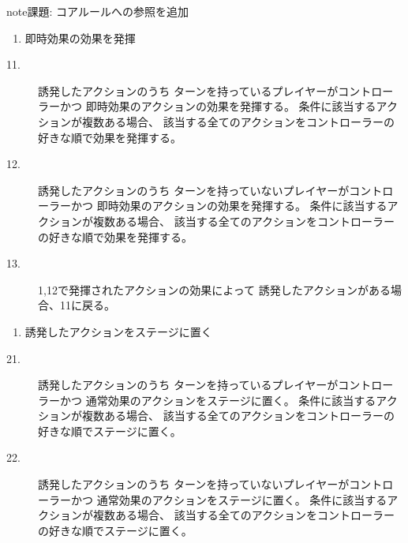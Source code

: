 \documentclass[letterpaper,10pt,dvipdfmx]{sphinxmanual}
\begin{document}
\begin{sphinxadmonition}{note}{\label{\detokenize{common/05-action_detail:id11}}課題:}
コアルールへの参照を追加
\end{sphinxadmonition}
\begin{enumerate}
%
\item {} 
即時効果の効果を発揮

\end{enumerate}
\begin{description}
\item[{1\sphinxhyphen{}1.}] \leavevmode
誘発したアクションのうち
ターンを持っているプレイヤーがコントローラーかつ
即時効果のアクションの効果を発揮する。
条件に該当するアクションが複数ある場合、
該当する全てのアクションをコントローラーの好きな順で効果を発揮する。

\item[{1\sphinxhyphen{}2.}] \leavevmode
誘発したアクションのうち
ターンを持っていないプレイヤーがコントローラーかつ
即時効果のアクションの効果を発揮する。
条件に該当するアクションが複数ある場合、
該当する全てのアクションをコントローラーの好きな順で効果を発揮する。

\item[{1\sphinxhyphen{}3.}] \sphinxhyphen{}1,1\sphinxhyphen{}2で発揮されたアクションの効果によって
誘発したアクションがある場合、1\sphinxhyphen{}1に戻る。

\end{description}
\begin{enumerate}
%
\setcounter{enumi}{1}
\item {} 
誘発したアクションをステージに置く

\end{enumerate}
\begin{description}
\item[{2\sphinxhyphen{}1.}] \leavevmode
誘発したアクションのうち
ターンを持っているプレイヤーがコントローラーかつ
通常効果のアクションをステージに置く。
条件に該当するアクションが複数ある場合、
該当する全てのアクションをコントローラーの好きな順でステージに置く。

\item[{2\sphinxhyphen{}2.}] \leavevmode
誘発したアクションのうち
ターンを持っていないプレイヤーがコントローラーかつ
通常効果のアクションをステージに置く。
条件に該当するアクションが複数ある場合、
該当する全てのアクションをコントローラーの好きな順でステージに置く。

\end{description}
\end{document}
